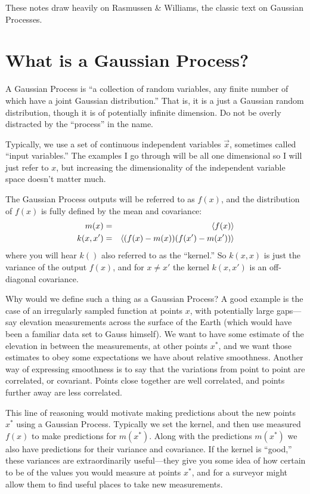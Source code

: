 These notes draw heavily on Rasmussen \& Williams, the classic text on
Gaussian Processes.

\section{What is a Gaussian Process?}

A Gaussian Process is ``a collection of random variables, any finite
number of which have a joint Gaussian distribution.'' That is, it is a
just a Gaussian random distribution, though it is of potentially
infinite dimension. Do not be overly distracted by the ``process'' in
the name.

Typically, we use a set of continuous independent variables $\vec{x}$,
sometimes called ``input variables.'' The examples I go through will
be all one dimensional so I will just refer to $x$, but increasing the
dimensionality of the independent variable space doesn't matter much.

The Gaussian Process outputs will be referred to as $f(x)$, and the
distribution of $f(x)$ is fully defined by the mean and covariance:
\begin{eqnarray}
 m(x) &=& \left\langle f(x) \right\rangle \cr
 k(x, x') &=& \left\langle (f(x) - m(x)) (f(x') - m(x'))\right\rangle \cr
\end{eqnarray}
where you will hear $k()$ also referred to as the ``kernel.'' So $k(x,
x)$ is just the variance of the output $f(x)$, and for $x\ne x'$ the
kernel $k(x, x')$ is an off-diagonal covariance.

Why would we define such a thing as a Gaussian Process? A good example
is the case of an irregularly sampled function at points $x$, with
potentially large gaps---say elevation measurements across the surface
of the Earth (which would have been a familiar data set to Gauss
himself). We want to have some estimate of the elevation in between
the measurements, at other points $x^\ast$, and we want those
estimates to obey some expectations we have about relative
smoothness. Another way of expressing smoothness is to say that the
variations from point to point are correlated, or covariant. Points
close together are well correlated, and points further away are less
correlated.

This line of reasoning would motivate making predictions about the new
points $x^\ast$ using a Gaussian Process. Typically we set the kernel,
and then use measured $f(x)$ to make predictions for
$m(x^\ast)$. Along with the predictions $m(x^\ast)$ we also have
predictions for their variance and covariance. If the kernel is
``good,'' these variances are extraordinarily useful---they give you
some idea of how certain to be of the values you would measure at
points $x^\ast$, and for a surveyor might allow them to find useful
places to take new measurements.

